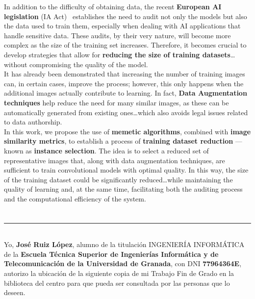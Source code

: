 In addition to the difficulty of obtaining data, the recent \textbf{European AI legislation} (IA Act)~\cite{}
establishes the need to audit not only the models but also the data used to train them, especially when dealing with AI
applications that handle sensitive data.
These audits, by their very nature, will become more complex as the size of the training set increases.
Therefore, it becomes crucial to develop strategies that allow for
\textbf{reducing the size of training datasets}\ldots without compromising the quality of the model. \\[6pt]

It has already been demonstrated that increasing the number of training images can, in certain cases, improve the
process; however, this only happens when the additional images actually contribute to learning.
In fact, \textbf{Data Augmentation techniques} help reduce the need for many similar images, as these can be
automatically generated from existing ones\ldots which also avoids legal issues related to data authorship. \\[6pt]

In this work, we propose the use of \textbf{memetic algorithms}, combined with \textbf{image similarity metrics}, to
establish a process of \textbf{training dataset reduction} — known as \textbf{instance selection}.
The idea is to select a reduced set of representative images that, along with data augmentation techniques, are
sufficient to train convolutional models with optimal quality.
In this way, the size of the training dataset could be significantly reduced\ldots while maintaining the quality of
learning and, at the same time, facilitating both the auditing process and the computational efficiency of the system.
\\[6pt]

\chapter*{}
\thispagestyle{empty}

\noindent\rule[-1ex]{\textwidth}{2pt}\\[4.5ex]

Yo, \textbf{José Ruiz López}, alumno de la titulación INGENIERÍA INFORMÁTICA de la \textbf{Escuela Técnica Superior
de Ingenierías Informática y de Telecomunicación de la Universidad de Granada}, con DNI \textbf{77964364E}, autorizo la
ubicación de la siguiente copia de mi Trabajo Fin de Grado en la biblioteca del centro para que pueda ser
consultada por las personas que lo deseen.

